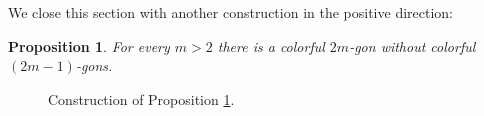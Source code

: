\documentclass[12pt]{amsart}
\theoremstyle{plain}
\newtheorem{proposition}[theorem]{Proposition}
\numberwithin{equation}{section}
\begin{document}
We close this section with another construction in the positive direction:

\begin{proposition}
\label{Pr:MinusOne} For every $m>2$ there is a colorful $2m$-gon without
colorful $(2m-1)$-gons.
\end{proposition}

\setlength{\unitlength}{1.3mm}
\begin{figure}[th]
\begin{center}
\begin{small}



\end{small}
\end{center}
\caption{Construction of Proposition \ref{Pr:MinusOne}.}\label{Fg:Clique}
\end{figure}
\end{document}
